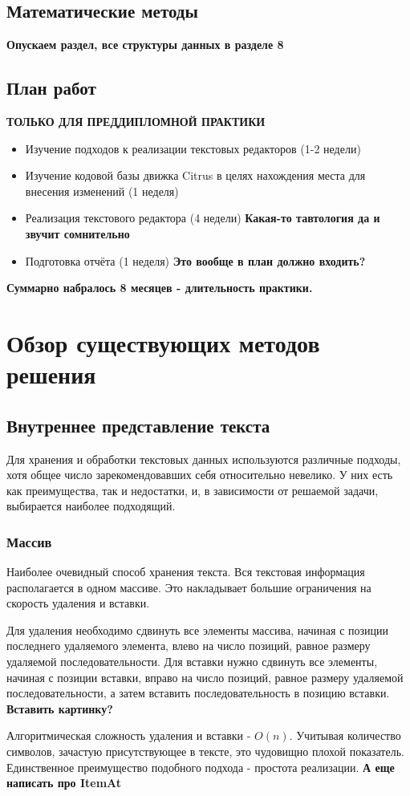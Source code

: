 \documentclass{fefu}
\begin{document}
		\subsection{Математические методы}
			\textbf{Опускаем раздел, все структуры данных в разделе 8}	
		\subsection{План работ}
			\par \textbf{ТОЛЬКО ДЛЯ ПРЕДДИПЛОМНОЙ ПРАКТИКИ}
			\begin{itemize}
				\item Изучение подходов к реализации текстовых редакторов (1-2 недели)
				\item Изучение кодовой базы движка Citrus в целях нахождения места для внесения
				изменений (1 неделя)
				\item Реализация текстового редактора (4 недели) \textbf{Какая-то тавтология 
				да и звучит сомнительно}
				\item Подготовка отчёта (1 неделя) \textbf{Это вообще в план должно входить?}
			\end{itemize}
			\textbf{Суммарно набралось 8 месяцев - длительность практики.}
	\section{Обзор существующих методов решения}
		\subsection{Внутреннее представление текста}
			\par Для хранения и обработки текстовых данных используются различные подходы,
				хотя общее число зарекомендовавших себя относительно невелико.
				\cite{TextEditorDataStructures} 
				У них есть как преимущества, так и недостатки, и, в зависимости от решаемой
				задачи, выбирается наиболее подходящий.
			\subsubsection{Массив}
				\par Наиболее очевидный способ хранения текста. Вся текстовая информация
				располагается в одном массиве. Это накладывает большие ограничения на скорость
				удаления и вставки.
				\par Для удаления необходимо сдвинуть все элементы массива, начиная с позиции
				последнего удаляемого элемента, влево на число позиций, равное размеру
				удаляемой последовательности. Для вставки нужно сдвинуть все элементы, начиная
				с позиции вставки, вправо на число позиций, равное размеру удаляемой
				последовательности, а затем вставить последовательность в позицию вставки.
				\textbf{Вставить картинку?}
				\par Алгоритмическая сложность удаления и вставки - $O(n)$. Учитывая количество
				символов, зачастую присутствующее в тексте, это чудовищно плохой показатель.
				Единственное преимущество подобного подхода - простота реализации.
				\textbf{А еще написать про ItemAt}
\end{document}
